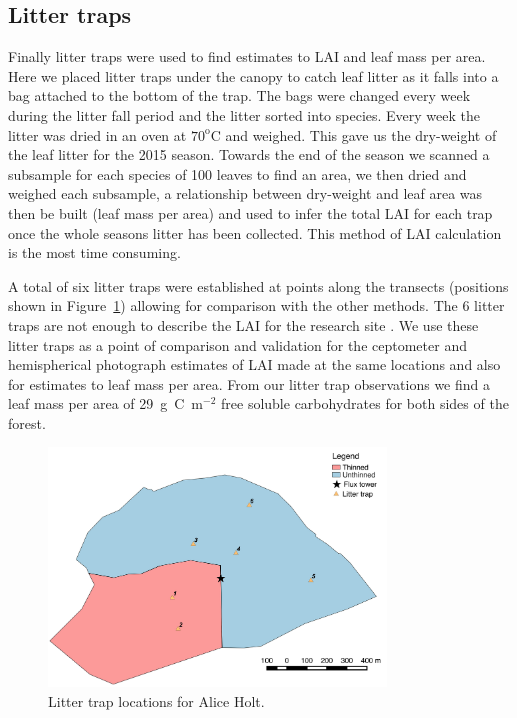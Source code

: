 \subsection{Litter traps}

Finally litter traps were used to find estimates to LAI and leaf mass per area. Here we placed litter traps under the canopy to catch leaf litter as it falls into a bag attached to the bottom of the trap. The bags were changed every week during the litter fall period and the litter sorted into species. Every week the litter was dried in an oven at $70^{\text{o}}\text{C}$ and weighed. This gave us the dry-weight of the leaf litter for the 2015 season. Towards the end of the season we scanned a subsample for each species of 100 leaves to find an area, we then dried and weighed each subsample, a relationship between dry-weight and leaf area was then be built (leaf mass per area) and used to infer the total LAI for each trap once the whole seasons litter has been collected. This method of LAI calculation is the most time consuming.  

A total of six litter traps were established at points along the transects (positions shown in Figure~\ref{chap4:fig:lit_traps}) allowing for comparison with the other methods. The 6 litter traps are not enough to describe the LAI for the research site \citep{kimmins1973some}. We use these litter traps as a point of comparison and validation for the ceptometer and hemispherical photograph estimates of LAI made at the same locations and also for estimates to leaf mass per area. From our litter trap observations we find a leaf mass per area of 29~g~C~m\(^{-2}\) free soluble carbohydrates for both sides of the forest.

\begin{figure}[ht]
    \centering
    \includegraphics[width=0.8\textwidth]{chapter/chapter4/litter_trap.pdf}
    \caption{Litter trap locations for Alice Holt.} \label{chap4:fig:lit_traps}
\end{figure}


